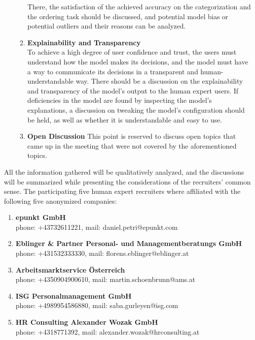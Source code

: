 \documentclass[draft,final]{thesisclass} %
\begin{document}
\begin{enumerate}
\begin{enumerate}
        There, the satisfaction of the achieved accuracy on the categorization and the ordering task should be discussed, and potential model bias or potential outliers and their reasons can be analyzed.
        \item \textbf{Explainability and Transparency}\\
        To achieve a high degree of user confidence and trust, the users must understand how the model makes its decisions, and the model must have a way to communicate its decisions in a transparent and human-understandable way.
        There should be a discussion on the explainability and transparency of the model's output to the human expert users.
        If deficiencies in the model are found by inspecting the model's explanations, a discussion on tweaking the model's configuration should be held, as well as whether it is understandable and easy to use.
        \item \textbf{Open Discussion}
        This point is reserved to discuss open topics that came up in the meeting that were not covered by the aforementioned topics.
    \end{enumerate}
\end{enumerate}
All the information gathered will be qualitatively analyzed, and the discussions will be summarized while presenting the considerations of the recruiters' common sense.
The participating five human expert recruiters where affiliated with the following five anonymized companies:
\begin{enumerate}
    \item \textbf{epunkt GmbH}\\
    phone: +43732611221, mail: daniel.petri@epunkt.com
    \item \textbf{Eblinger \& Partner Personal- und Managementberatungs GmbH}\\
    phone: +431532333330, mail: florens.eblinger@eblinger.at
    \item \textbf{Arbeitsmarktservice Österreich}\\
    phone: +4350904900610, mail: martin.schoenbrunn@ams.at
    \item \textbf{ISG Personalmanagement GmbH}\\
    phone: +4989954586880, mail: saba.gurleyen@isg.com
    \item \textbf{HR Consulting Alexander Wozak GmbH}\\
    phone: +4318771392, mail: alexander.wozak@hrconsulting.at
\end{enumerate}
\end{document}

